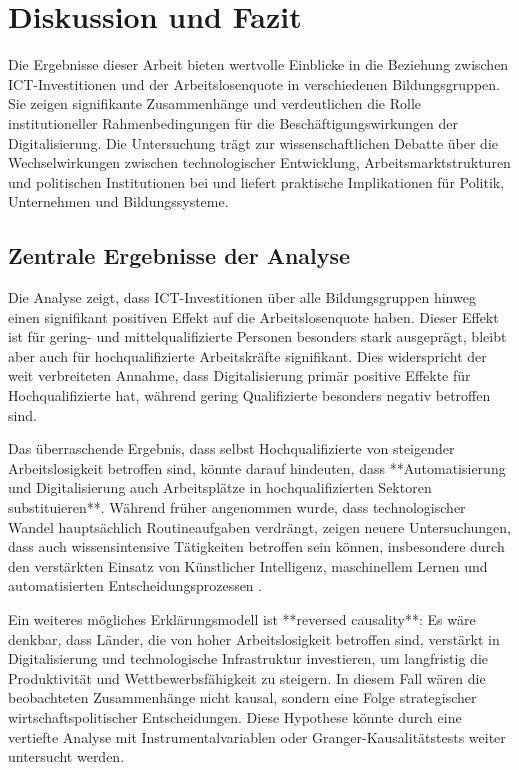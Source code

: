 
\section{Diskussion und Fazit}

Die Ergebnisse dieser Arbeit bieten wertvolle Einblicke in die Beziehung zwischen 
\ac{ICT}-Investitionen und der Arbeitslosenquote in verschiedenen Bildungsgruppen. Sie 
zeigen signifikante Zusammenhänge und verdeutlichen die Rolle institutioneller 
Rahmenbedingungen für die Beschäftigungswirkungen der Digitalisierung. Die Untersuchung 
trägt zur wissenschaftlichen Debatte über die Wechselwirkungen zwischen technologischer 
Entwicklung, Arbeitsmarktstrukturen und politischen Institutionen bei und liefert 
praktische Implikationen für Politik, Unternehmen und Bildungssysteme.

\subsection{Zentrale Ergebnisse der Analyse}

Die Analyse zeigt, dass \ac{ICT}-Investitionen über alle Bildungsgruppen hinweg einen 
signifikant positiven Effekt auf die Arbeitslosenquote haben. Dieser Effekt ist für 
gering- und mittelqualifizierte Personen besonders stark ausgeprägt, bleibt aber auch für 
hochqualifizierte Arbeitskräfte signifikant. Dies widerspricht der weit verbreiteten 
Annahme, dass Digitalisierung primär positive Effekte für Hochqualifizierte hat, während 
gering Qualifizierte besonders negativ betroffen sind. 

Das überraschende Ergebnis, dass selbst Hochqualifizierte von steigender Arbeitslosigkeit 
betroffen sind, könnte darauf hindeuten, dass **Automatisierung und Digitalisierung auch 
Arbeitsplätze in hochqualifizierten Sektoren substituieren**. Während früher angenommen wurde, 
dass technologischer Wandel hauptsächlich Routineaufgaben verdrängt, zeigen neuere 
Untersuchungen, dass auch wissensintensive Tätigkeiten betroffen sein können, insbesondere 
durch den verstärkten Einsatz von Künstlicher Intelligenz, maschinellem Lernen und 
automatisierten Entscheidungsprozessen \parencite[vgl.][S. 3-5]{brynjolfsson2014thesecond}.

Ein weiteres mögliches Erklärungsmodell ist **reversed causality**: Es wäre denkbar, dass Länder, 
die von hoher Arbeitslosigkeit betroffen sind, verstärkt in Digitalisierung und technologische 
Infrastruktur investieren, um langfristig die Produktivität und Wettbewerbsfähigkeit zu steigern. 
In diesem Fall wären die beobachteten Zusammenhänge nicht kausal, sondern eine Folge strategischer 
wirtschaftspolitischer Entscheidungen. Diese Hypothese könnte durch eine vertiefte Analyse mit 
Instrumentalvariablen oder Granger-Kausalitätstests weiter untersucht werden.

